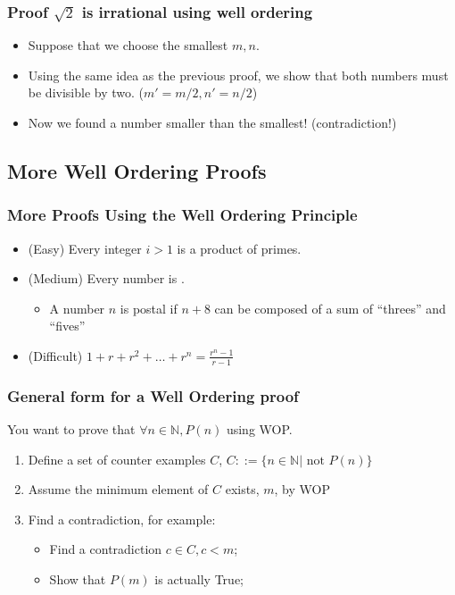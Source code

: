 \documentclass{beamer}
\begin{document}
\begin{frame}
  \frametitle{Proof $\sqrt{2}$ is irrational using well ordering}
  \begin{itemize}
  \item Suppose that we choose the \alert{smallest} $m,n$.
    \bigskip

  \item Using the same idea as the previous proof, we show that both
    numbers must be divisible by two. ($m' = m/2, n' = n/2$)
    \bigskip

  \item Now we found a number \alert{smaller than the smallest! (contradiction!)}
  \end{itemize}
\end{frame}

\subsection{More Well Ordering Proofs}
\begin{frame}
  \frametitle{More Proofs Using the Well Ordering Principle}

  \begin{itemize}
  \item (Easy) Every integer $i > 1$ is a product of primes.

    \bigskip

  \item (Medium) Every number is .
    \begin{itemize}
    \item A number $n$ is postal if $n+8$ can be composed of a sum of
      ``threes'' and ``fives''
    \end{itemize}

    \bigskip

  \item (Difficult) $1 + r + r^2 + \ldots + r^n = \frac{r^n-1}{r-1}$
  \end{itemize}
\end{frame}

\begin{frame}
  \frametitle{General form for a Well Ordering proof}
  You want to prove that $\forall n \in \mathbb{N}, P(n)$ using WOP.

  \begin{enumerate}
  \item Define a set of counter examples $C$, $C ::=\{n \in
    \mathbb{N}|\text{ not } P(n)\}$
  \item Assume the minimum element of $C$ exists, $m$, by WOP
  \item Find a contradiction, for example:
    \begin{itemize}
    \item Find a contradiction $c \in C, c < m$;
    \item Show that $P(m)$ is actually True;
    \end{itemize}

  \end{enumerate}
\end{frame}
\end{document}
